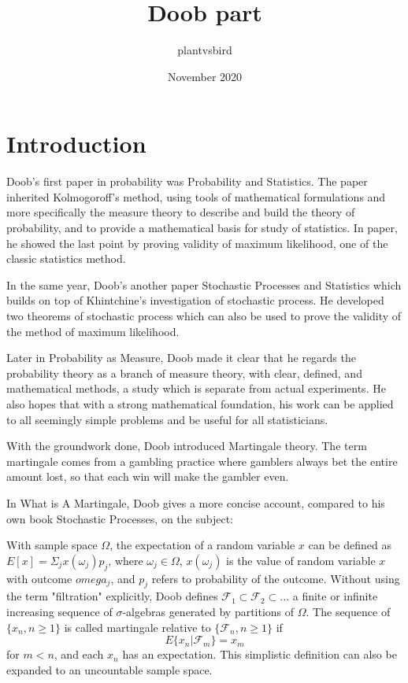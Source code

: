 \documentclass{article}
\title{Doob part}
\author{plantvsbird }
\date{November 2020}
\begin{document}
\maketitle





\section{Introduction}


Doob's first paper in probability was Probability and Statistics. The paper inherited Kolmogoroff's method, using tools of mathematical formulations and more specifically the measure theory to describe and build the theory of probability, and to provide a mathematical basis for study of statistics. In paper, he showed the last point by proving validity of maximum likelihood, one of the classic statistics method.

In the same year, Doob's another paper Stochastic Processes and Statistics which builds on top of Khintchine's investigation of stochastic process. He developed two theorems of stochastic process which can also be used to prove the validity of the method of maximum likelihood.

Later in Probability as Measure, Doob made it clear that he regards the probability theory as a branch of measure theory, with clear, defined, and mathematical methods, a study which is separate from actual experiments. He also hopes that with a strong mathematical foundation, his work can be applied to all seemingly simple problems and be useful for all statisticians. 

With the groundwork done, Doob introduced Martingale theory. The term martingale comes from a gambling practice where gamblers always bet the entire amount lost, so that each win will make the gambler even.

In What is A Martingale, Doob gives a more concise account, compared to his own book Stochastic Processes, on the subject:

With sample space $\Omega$, the expectation of a random variable $x$ can be defined as $E[x]=\Sigma_j x(\omega_j)p_j$, where $\omega_j \in \Omega$, $x(\omega_j)$ is the value of random variable $x$ with outcome $omega_j$, and $p_j$ refers to probability of the outcome. Without using the term "filtration" explicitly, Doob defines $\mathcal{F}_1 \subset \mathcal{F}_2 \subset ...$ a finite or infinite increasing sequence of $\sigma$-algebras generated by partitions of $\Omega$. The sequence of $\{x_n, n \geq 1\}$ is called martingale relative to $\{\mathcal{F}_n, n \geq 1\}$ if
\begin{equation}
	E\{x_n | \mathcal{F}_m\}= x_m
\end{equation}
for $m < n$, and each $x_n$ has an expectation. This simplistic definition can also be expanded to an uncountable sample space.
\end{document}
